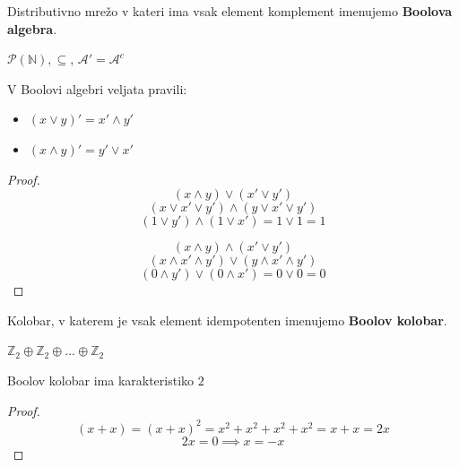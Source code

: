 \documentclass{beamer}
\begin{document}
\begin{frame}
\begin{definition}
Distributivno mrežo v kateri ima vsak element komplement imenujemo \textbf{Boolova algebra}.
\end{definition}
\begin{example}
$\mathcal{P}(\mathbb{N}), \subseteq$, $\mathcal{A}' = \mathcal{A}^c$ 
\end{example}
\end{frame}

\begin{frame}
\begin{theorem}
V Boolovi algebri veljata pravili:
\begin{itemize}
\item $(x \lor y)' = x' \land y'$
\item $(x \land y)' = y' \lor x'$ 
\end{itemize}
\end{theorem}
\end{frame}

\begin{frame}
\begin{proof}
$$(x \land y) \lor (x' \lor y')$$  $$(x \lor x' \lor y') \land (y \lor x' \lor y')$$  $$(1 \lor y') \land (1 \lor x') = 1 \lor 1 = 1$$

$$(x \land y) \land (x' \lor y')$$  $$(x \land x' \land y') \lor (y \land x' \land y')$$  $$(0 \land y') \lor (0 \land x') = 0 \lor 0 = 0$$

\end{proof}

\end{frame}


\begin{frame}%
\begin{definition}
Kolobar, v katerem je vsak element idempotenten imenujemo \textbf{Boolov kolobar}.
\end{definition}
\begin{example}
$\mathbb{Z}_2 \oplus \mathbb{Z}_2 \oplus \dots \oplus \mathbb{Z}_2$
\end{example}
\end{frame}


\begin{frame}
\begin{theorem}
Boolov kolobar ima karakteristiko $2$
\end{theorem}
\pause
\begin{proof}
$$(x + x) = (x + x)^2 = x^2 + x^2 + x^2 + x^2 = x + x = 2x$$ 
$$2x = 0 \implies x = -x$$
\end{proof}
\end{frame}
\end{document}
